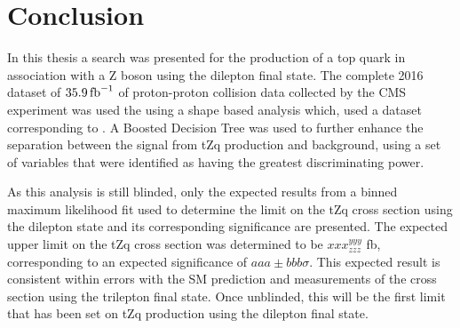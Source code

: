 \chapter{Conclusion}\label{chapter:conclusion}
In this thesis a search was presented for the production of a top quark in association with a Z boson using the dilepton final state.
The complete 2016 dataset of $35.9\mbox{\ensuremath{\,\text{fb}^\text{$-$1}}}$ of proton-proton collision data collected by the CMS experiment was used
 the using a shape based analysis which, used a dataset corresponding to .
A Boosted Decision Tree was used to further enhance the separation between the signal from tZq production and background, using a set of variables that were identified as having the greatest discriminating power.

As this analysis is still blinded, only the expected results from a binned maximum likelihood fit used to determine the limit on the tZq cross section using the dilepton state and its corresponding significance are presented.
The expected upper limit on the tZq cross section was determined to be $xxx^{yyy}_{zzz}$ fb, corresponding to an expected significance of $aaa \pm bbb \sigma$.
This expected result is consistent within errors with the SM prediction and measurements of the cross section using the trilepton final state.  
Once unblinded, this will be the first limit that has been set on tZq production using the dilepton final state.

%
%



